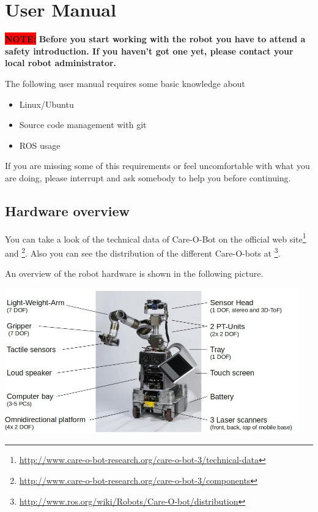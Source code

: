 \chapter{User Manual}
\label{chap:user}    

{\colorbox{red}{\textbf{NOTE:}}}\textbf{ Before you start working with the robot you have to attend a safety introduction. If you haven't got one yet, please contact your local robot administrator.}

The following user manual requires some basic knowledge about
\begin{itemize}
\item Linux/Ubuntu
\item Source code management with git
\item ROS usage
\end{itemize}
If you are missing some of this requirements or feel uncomfortable with what you are doing, please interrupt and ask somebody to help you before continuing.

\section{Hardware overview}
You can take a look of the technical data of Care-O-Bot on the official web site\footnote{\url{http://www.care-o-bot-research.org/care-o-bot-3/technical-data}} and \footnote{\url{http://www.care-o-bot-research.org/care-o-bot-3/components}}. Also you can see the distribution of the different Care-O-bots at \footnote{\url{http://www.ros.org/wiki/Robots/Care-O-bot/distribution}}.

An overview of the robot hardware is shown in the following picture.
\begin{center}
 \includegraphics[width=0.95\textwidth]{images/hardware_overview.jpg}
\end{center}

